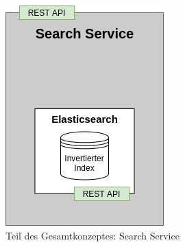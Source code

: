 \begin{figure}[H]
    \centering
    \includegraphics[width=0.9\linewidth]{images/SearchService.png}
    \caption{Teil des Gesamtkonzeptes: Search Service}
    \label{fig:SearchService}
\end{figure}